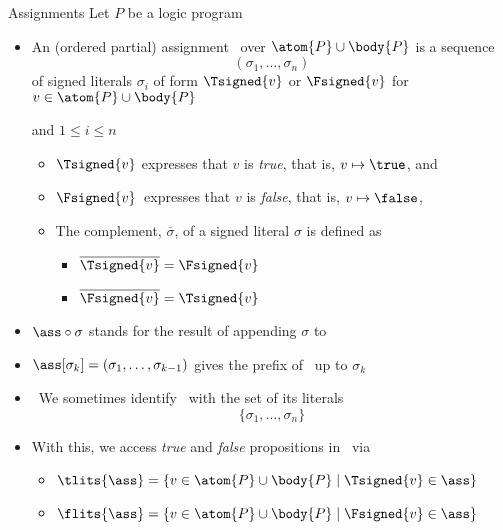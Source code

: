 \begin{frame}{Assignments}
  Let $P$ be a logic program
  \begin{itemize}
  \item<2-> An (ordered partial) \alert{assignment} \ass\ over $\atom{P}\cup\body{P}$
    is a sequence
    \[
    (\sigma_1,\dots,\sigma_n)
    \]
    of \alert{signed literals}
    $\sigma_i$ of form \alert{$\Tsigned{v}$} or \alert{$\Fsigned{v}$} for
    $v\in\atom{P}\cup\body{P}$
    \par and $1 \leq i \leq n$
    \medskip
    \begin{itemize}\normalsize
    \item<only@3-4> $\Tsigned{v}$   expresses that $v$ is \emph{true},\; that is, $v\mapsto\true$, and
    \item<only@3-4> $\Fsigned{v}$\, expresses that $v$ is \emph{false}, that is, $v\mapsto\false$,
      \medskip
    \item<only@4  > The complement, $\overline{\sigma}$, of a signed literal $\sigma$ is defined as
      \begin{itemize}\normalsize
      \item $\overline{\Tsigned{v}} = \Fsigned{v}$
      \item $\overline{\Fsigned{v}} = \Tsigned{v}$
      \end{itemize}
    \end{itemize}
  \item<only@6> $\ass\circ\sigma$ stands for the result of appending $\sigma$ to \ass
  \item<only@6> $\ass[\sigma_k]=(\sigma_1,\ldots,\sigma_{k-1})$ gives the prefix of \ass\ up to $\sigma_k$
    \medskip
  \item<only@8->  \ We sometimes identify \ass\ with the set of its literals
    \[
    \{\sigma_1,\dots,\sigma_n\}
    \]
  \item<only@9>
    With this,
    we access \emph{true} and \emph{false} propositions in \ass\ via
    \begin{itemize}\normalsize
    \item \( \tlits{\ass} = \{v \in \atom{P}\cup\body{P} \mid \Tsigned{v} \in\ass\} \)
    \item \( \flits{\ass} = \{v \in \atom{P}\cup\body{P} \mid \Fsigned{v} \in\ass\} \)
    \end{itemize}
  \end{itemize}
\end{frame}
